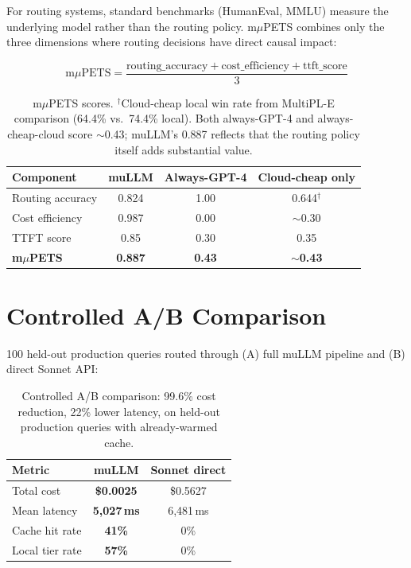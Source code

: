 \documentclass[11pt]{article}
\begin{document}
For routing systems, standard benchmarks (HumanEval, MMLU) measure the
underlying model rather than the routing policy. m$\mu$PETS combines
only the three dimensions where routing decisions have direct causal
impact:

\[
\text{m}\mu\text{PETS} = \frac{\text{routing\_accuracy} + \text{cost\_efficiency} + \text{ttft\_score}}{3}
\]

\begin{table}[h]
\centering
\small
\begin{tabular}{lccc}
\toprule
\textbf{Component} & \textbf{muLLM} & \textbf{Always-GPT-4} & \textbf{Cloud-cheap only} \\
\midrule
Routing accuracy & 0.824 & 1.00 & 0.644$^\dagger$ \\
Cost efficiency & 0.987 & 0.00 & $\sim$0.30 \\
TTFT score & 0.85 & 0.30 & 0.35 \\
\midrule
\textbf{m$\mu$PETS} & \textbf{0.887} & \textbf{0.43} & \textbf{$\sim$0.43} \\
\bottomrule
\end{tabular}
\caption{m$\mu$PETS scores. $^\dagger$Cloud-cheap local win rate from MultiPL-E comparison (64.4\% vs.\ 74.4\% local). Both always-GPT-4 and always-cheap-cloud score $\sim$0.43; muLLM's 0.887 reflects that the routing policy itself adds substantial value.}
\label{tab:mpets}
\end{table}

\section{Controlled A/B Comparison}

100 held-out production queries routed through (A) full muLLM pipeline
and (B) direct Sonnet API:

\begin{table}[h]
\centering
\small
\begin{tabular}{lcc}
\toprule
\textbf{Metric} & \textbf{muLLM} & \textbf{Sonnet direct} \\
\midrule
Total cost & \textbf{\$0.0025} & \$0.5627 \\
Mean latency & \textbf{5,027\,ms} & 6,481\,ms \\
Cache hit rate & \textbf{41\%} & 0\% \\
Local tier rate & \textbf{57\%} & 0\% \\
\bottomrule
\end{tabular}
\caption{Controlled A/B comparison: 99.6\% cost reduction, 22\% lower latency, on held-out production queries with already-warmed cache.}
\label{tab:ab}
\end{table}
\end{document}
